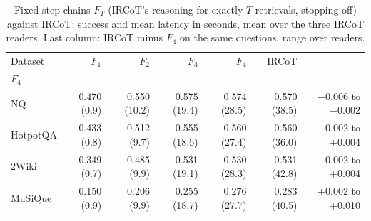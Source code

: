 \begin{table}[t]
\centering\small
\setlength{\tabcolsep}{4pt}
\caption{Fixed step chains $F_T$ (IRCoT's reasoning for exactly $T$ retrievals, stopping off) against IRCoT: success and mean latency in seconds, mean over the three IRCoT readers. Last column: IRCoT minus $F_4$ on the same questions, range over readers.}
\label{tab:multistep}
\begin{tabular*}{\linewidth}{@{\extracolsep{\fill}}lrrrrrr}
\toprule
Dataset & $F_1$ & $F_2$ & $F_3$ & $F_4$ & IRCoT & \begin{tabular}[b]{@{}r@{}}IRCoT minus \\ $F_4$\end{tabular} \\
\midrule
NQ & 0.470 (0.9) & 0.550 (10.2) & 0.575 (19.4) & 0.574 (28.5) & 0.570 (38.5) & $-$0.006 to $-$0.002 \\
HotpotQA & 0.433 (0.8) & 0.512 (9.7) & 0.555 (18.6) & 0.560 (27.4) & 0.560 (36.0) & $-$0.002 to +0.004 \\
2Wiki & 0.349 (0.7) & 0.485 (9.9) & 0.531 (19.1) & 0.530 (28.3) & 0.531 (42.8) & $-$0.002 to +0.004 \\
MuSiQue & 0.150 (0.9) & 0.206 (9.9) & 0.255 (18.7) & 0.276 (27.7) & 0.283 (40.5) & +0.002 to +0.010 \\
\bottomrule
\end{tabular*}
\end{table}
